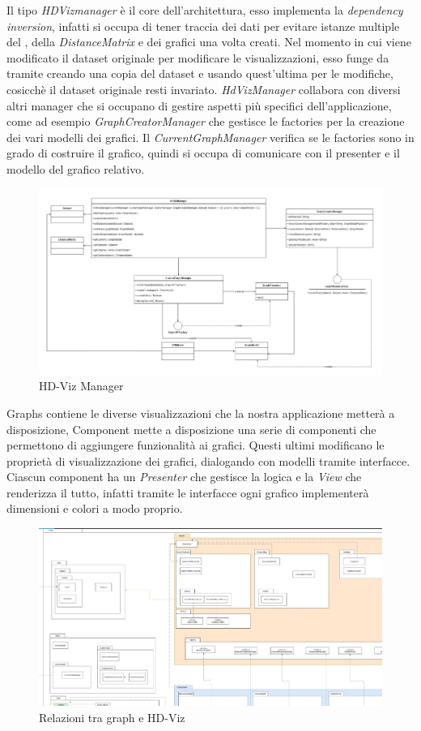 \documentclass[../manuale_sviluppatore.tex]{subfiles}
\begin{document}
Il tipo \emph{HDVizmanager} è il core dell'architettura, esso implementa la \emph{dependency inversion}, 
infatti si occupa di tener traccia dei dati per evitare istanze multiple del , 
della \emph{DistanceMatrix} e dei grafici una volta creati. 
Nel momento in cui viene modificato il dataset originale per modificare le visualizzazioni, esso 
funge da tramite creando una copia del dataset e usando quest'ultima per le modifiche, cosicchè il 
dataset originale resti invariato.
\emph{HdVizManager} collabora con diversi altri manager che si occupano di gestire aspetti più 
specifici dell'applicazione, come ad esempio \emph{GraphCreatorManager} che gestisce le factories 
per la creazione dei vari modelli dei grafici. 
Il \emph{CurrentGraphManager} verifica se le factories sono in grado di costruire il grafico, 
quindi si occupa di comunicare con il presenter e il modello del grafico relativo.


\begin{figure}[H]
	\centering
	\includegraphics[width=18cm]{src/img/core-hdvizmanager.jpg}
	\caption{HD-Viz Manager}
\end{figure}

Graphs contiene le diverse visualizzazioni che la nostra applicazione metterà a disposizione, Component mette a disposizione una serie di componenti che permettono di aggiungere funzionalità ai grafici.
Questi ultimi modificano le proprietà di visualizzazione dei grafici, dialogando con modelli tramite interfacce. Ciascun component ha un \emph{Presenter} che gestisce la logica e la \emph{View} che renderizza il tutto,
infatti tramite le interfacce ogni grafico implementerà dimensioni e colori a modo proprio.

\begin{figure}[H]
	\centering
	\includegraphics[width=18cm]{src/img/graph-e-hdviz.jpg}
	\caption{Relazioni tra graph e HD-Viz}
\end{figure}
\end{document}
